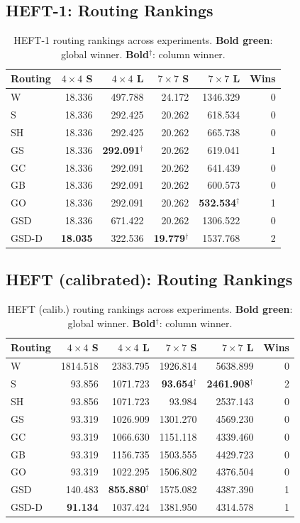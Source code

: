 \documentclass[11pt]{article}
\newcommand{\win}[1]{\textcolor{green!50!black}{\textbf{#1}}}
\newcommand{\bad}[1]{\textcolor{red!70!black}{#1}}
\begin{document}
\subsection{HEFT-1: Routing Rankings}
\begin{table}[H]
\centering
\small
\setlength{\tabcolsep}{4pt}
\begin{tabular}{l  r r r r r}
\toprule
\textbf{Routing} & $4\times4$ S & $4\times4$ L & $7\times7$ S & $7\times7$ L & \textbf{Wins} \\
\midrule
W & \bad{18.336} & 497.788 & \bad{24.172} & 1346.329 & 0 \\
S & 18.336 & 292.425 & 20.262 & 618.534 & 0 \\
SH & 18.336 & 292.425 & 20.262 & 665.738 & 0 \\
GS & 18.336 & \textbf{292.091}$^\dagger$ & 20.262 & 619.041 & 1 \\
GC & 18.336 & 292.091 & 20.262 & 641.439 & 0 \\
GB & 18.336 & 292.091 & 20.262 & 600.573 & 0 \\
GO & 18.336 & 292.091 & 20.262 & \textbf{532.534}$^\dagger$ & 1 \\
GSD & 18.336 & \bad{671.422} & 20.262 & 1306.522 & 0 \\
GSD\mbox{-}D & \win{18.035} & 322.536 & \textbf{19.779}$^\dagger$ & \bad{1537.768} & 2 \\
\bottomrule
\end{tabular}
\caption{HEFT-1 routing rankings across experiments. \win{Bold green}: global winner. \textbf{Bold}$^\dagger$: column winner.}
\end{table}
\subsection{HEFT (calibrated): Routing Rankings}
\begin{table}[H]
\centering
\small
\setlength{\tabcolsep}{4pt}
\begin{tabular}{l  r r r r r}
\toprule
\textbf{Routing} & $4\times4$ S & $4\times4$ L & $7\times7$ S & $7\times7$ L & \textbf{Wins} \\
\midrule
W & \bad{1814.518} & \bad{2383.795} & \bad{1926.814} & \bad{5638.899} & 0 \\
S & 93.856 & 1071.723 & \textbf{93.654}$^\dagger$ & \textbf{2461.908}$^\dagger$ & 2 \\
SH & 93.856 & 1071.723 & 93.984 & 2537.143 & 0 \\
GS & 93.319 & 1026.909 & 1301.270 & 4569.230 & 0 \\
GC & 93.319 & 1066.630 & 1151.118 & 4339.460 & 0 \\
GB & 93.319 & 1156.735 & 1503.555 & 4429.723 & 0 \\
GO & 93.319 & 1022.295 & 1506.802 & 4376.504 & 0 \\
GSD & 140.483 & \textbf{855.880}$^\dagger$ & 1575.082 & 4387.390 & 1 \\
GSD\mbox{-}D & \win{91.134} & 1037.424 & 1381.950 & 4314.578 & 1 \\
\bottomrule
\end{tabular}
\caption{HEFT (calib.) routing rankings across experiments. \win{Bold green}: global winner. \textbf{Bold}$^\dagger$: column winner.}
\end{table}
\end{document}
